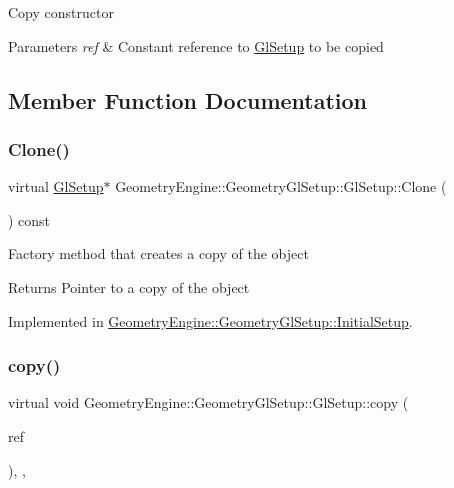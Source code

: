 Copy constructor 
\begin{DoxyParams}{Parameters}
{\em ref} & Constant reference to \mbox{\hyperlink{class_geometry_engine_1_1_geometry_gl_setup_1_1_gl_setup}{Gl\+Setup}} to be copied \\
\hline
\end{DoxyParams}


\subsection{Member Function Documentation}
\mbox{\label{class_geometry_engine_1_1_geometry_gl_setup_1_1_gl_setup_adf97b18fd8af32c63a189983ab35d5ae}} 
\subsubsection{\texorpdfstring{Clone()}{Clone()}}
{\footnotesize\ttfamily virtual \mbox{\hyperlink{class_geometry_engine_1_1_geometry_gl_setup_1_1_gl_setup}{Gl\+Setup}}$\ast$ Geometry\+Engine\+::\+Geometry\+Gl\+Setup\+::\+Gl\+Setup\+::\+Clone (\begin{DoxyParamCaption}{ }\end{DoxyParamCaption}) const\hspace{0.3cm}{\ttfamily [pure virtual]}}

Factory method that creates a copy of the object \begin{DoxyReturn}{Returns}
Pointer to a copy of the object 
\end{DoxyReturn}


Implemented in \mbox{\hyperlink{class_geometry_engine_1_1_geometry_gl_setup_1_1_initial_setup_ade45cd909edd6ff3cae7323d5e1c53d0}{Geometry\+Engine\+::\+Geometry\+Gl\+Setup\+::\+Initial\+Setup}}.

\mbox{\label{class_geometry_engine_1_1_geometry_gl_setup_1_1_gl_setup_a97e569658af28d7d60a3be95fa8cb0af}} 
\subsubsection{\texorpdfstring{copy()}{copy()}}
{\footnotesize\ttfamily virtual void Geometry\+Engine\+::\+Geometry\+Gl\+Setup\+::\+Gl\+Setup\+::copy (\begin{DoxyParamCaption}\item[{const \mbox{\hyperlink{class_geometry_engine_1_1_geometry_gl_setup_1_1_gl_setup}{Gl\+Setup}} \&}]{ref }\end{DoxyParamCaption})\hspace{0.3cm}{\ttfamily [inline]}, {\ttfamily [protected]}, {\ttfamily [virtual]}}


